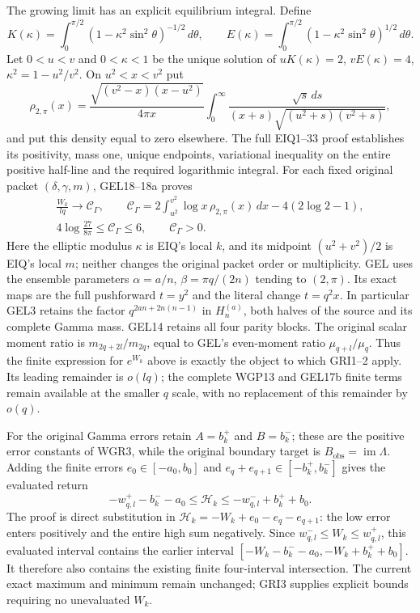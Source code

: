 \documentclass[11pt,a4paper]{article}
\begin{document}
The growing limit has an explicit equilibrium integral. Define
\[
 K(\kappa)=\int_0^{\pi/2}(1-\kappa^2\sin^2\theta)^{-1/2}\,d\theta,
 \qquad
 E(\kappa)=\int_0^{\pi/2}(1-\kappa^2\sin^2\theta)^{1/2}\,d\theta.
\]
Let $0<u<v$ and $0<\kappa<1$ be the unique solution of
$uK(\kappa)=2$, $vE(\kappa)=4$, $\kappa^2=1-u^2/v^2$.
On $u^2<x<v^2$ put
\[
 \rho_{2,\pi}(x)=
 \frac{\sqrt{(v^2-x)(x-u^2)}}{4\pi x}
 \int_0^\infty
 \frac{\sqrt s\,ds}{(x+s)\sqrt{(u^2+s)(v^2+s)}},
\]
and put this density equal to zero elsewhere. The full EIQ1--33
proof establishes its positivity, mass one, unique endpoints,
variational inequality on the entire positive half-line and the
required logarithmic integral. For each fixed original packet
$(\delta,\gamma,m)$, GEL18--18a proves
\[
\begin{gathered}
 \frac{W_k}{lq}\longrightarrow\mathcal C_\Gamma,
 \qquad \mathcal C_\Gamma=
 2\int_{u^2}^{v^2}\log x\,\rho_{2,\pi}(x)\,dx
                                      -4(2\log2-1),\\
 4\log\frac{27}{8\pi}\leq\mathcal C_\Gamma\leq6,
 \qquad \mathcal C_\Gamma>0.
\end{gathered}\tag{GRI2}
\]
Here the elliptic modulus $\kappa$ is EIQ's local $k$, and its
midpoint $(u^2+v^2)/2$ is EIQ's local $m$; neither changes the
original packet order or multiplicity. GEL uses the ensemble
parameters $\alpha=a/n$, $\beta=\pi q/(2n)$ tending to $(2,\pi)$.
Its exact maps are the full pushforward $t=y^2$ and the literal
change $t=q^2x$. In particular GEL3 retains the factor
$q^{2an+2n(n-1)}$ in $H_n^{(a)}$, both halves of the source and
its complete Gamma mass. GEL14 retains all four parity blocks.
The original scalar moment ratio is $m_{2q+2l}/m_{2q}$, equal
to GEL's even-moment ratio $\mu_{q+l}/\mu_q$. Thus the finite
expression for $e^{W_k}$ above is exactly the object to which
GRI1--2 apply. Its leading remainder is $o(lq)$; the complete
WGP13 and GEL17b finite terms remain available at the smaller
$q$ scale, with no replacement of this remainder by $o(q)$.

For the original Gamma errors retain $A=b_k^+$ and $B=b_k^-$;
these are the positive error constants of WGR3, while the original
boundary target is $B_{\mathrm{obs}}=\operatorname{im}\Lambda$.
Adding the finite errors $e_0\in[-a_0,b_0]$ and
$e_q+e_{q+1}\in[-b_k^+,b_k^-]$ gives the evaluated return
\[
 -w^+_{q,l}-b_k^--a_0\leq\mathcal H_k
                        \leq-w^-_{q,l}+b_k^++b_0.
 \tag{GRI3}
\]
The proof is direct substitution in
$\mathcal H_k=-W_k+e_0-e_q-e_{q+1}$: the low error enters
positively and the entire high sum negatively. Since
$w^-_{q,l}\leq W_k\leq w^+_{q,l}$, this evaluated interval
contains the earlier interval
$[-W_k-b_k^--a_0,-W_k+b_k^++b_0]$. It therefore also
contains the existing finite four-interval intersection.
The current exact maximum and minimum remain unchanged;
GRI3 supplies explicit bounds requiring no unevaluated $W_k$.
\end{document}
